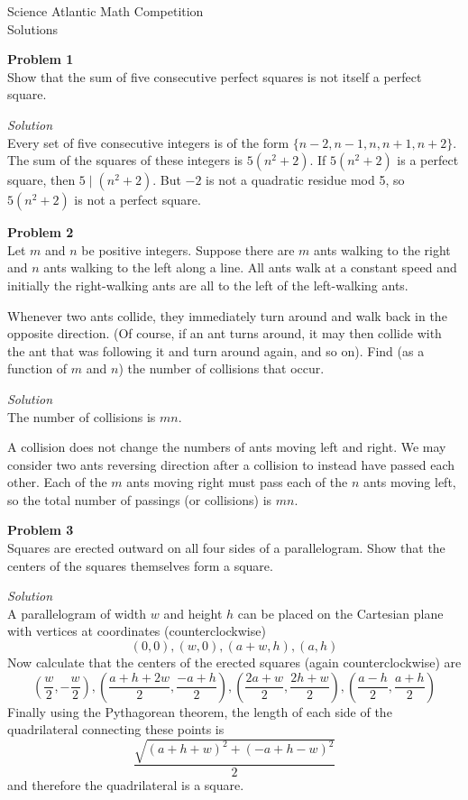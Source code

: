 \documentclass{amsart}
\begin{document}
\begin{center}
Science Atlantic Math Competition\\
Solutions
\end{center}

\textbf{Problem 1}\\
Show that the sum of five consecutive perfect squares is not itself a perfect square.

\textit{Solution}\\
Every set of five consecutive integers is of the form $\{n - 2, n - 1, n, n + 1, n + 2\}$.
The sum of the squares of these integers is $5(n^2 + 2)$.
If $5(n^2 + 2)$ is a perfect square, then $5 \mid (n^2 + 2)$.
But $-2$ is not a quadratic residue mod 5, so $5(n^2 + 2)$ is not a perfect square.

\textbf{Problem 2}\\
Let $m$ and $n$ be positive integers.
Suppose there are $m$ ants walking to the right and $n$ ants walking to the left along a line.
All ants walk at a constant speed and initially the right-walking ants are all to the left of the left-walking ants.

Whenever two ants collide, they immediately turn around and walk back in the opposite direction.
(Of course, if an ant turns around, it may then collide with the ant that was following it and turn around again, and so on).
Find (as a function of $m$ and $n$) the number of collisions that occur.

\textit{Solution}\\
The number of collisions is $mn$.

A collision does not change the numbers of ants moving left and right.
We may consider two ants reversing direction after a collision to instead have passed each other.
Each of the $m$ ants moving right must pass each of the $n$ ants moving left, so the total number of passings (or collisions) is $mn$.

\textbf{Problem 3}\\
Squares are erected outward on all four sides of a parallelogram.
Show that the centers of the squares themselves form a square.

\textit{Solution}\\
A parallelogram of width $w$ and height $h$ can be placed on the Cartesian plane with vertices at coordinates (counterclockwise)
\[ (0,0), (w, 0), (a + w, h), (a, h) \]
Now calculate that the centers of the erected squares (again counterclockwise) are
\[ \left( \frac{w}{2}, -\frac{w}{2} \right), \left( \frac{a + h + 2w}{2}, \frac{-a + h}{2} \right), \left( \frac{2a + w}{2}, \frac{2h + w}{2} \right), \left( \frac{a - h}{2}, \frac{a + h}{2} \right) \]
Finally using the Pythagorean theorem, the length of each side of the quadrilateral connecting these points is
\[ \frac{\sqrt{(a + h + w)^2 + (-a + h - w)^2}}{2} \]
and therefore the quadrilateral is a square.
\end{document}
